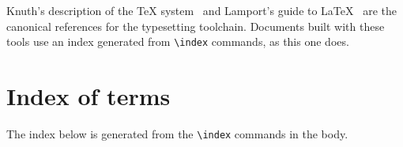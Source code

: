 \documentclass[11pt,a4paper]{article}
\begin{document}
Knuth's description of the \TeX{} system~\cite{knuth1984} and Lamport's
guide to \LaTeX{}~\cite{lamport1994} are the canonical references for the
typesetting toolchain. Documents built with these tools use an
index generated from \verb|\index| commands, as this one does.




\appendix

\section{Index of terms}

The index below is generated from the \verb|\index| commands in the body.

\printindex
\end{document}
